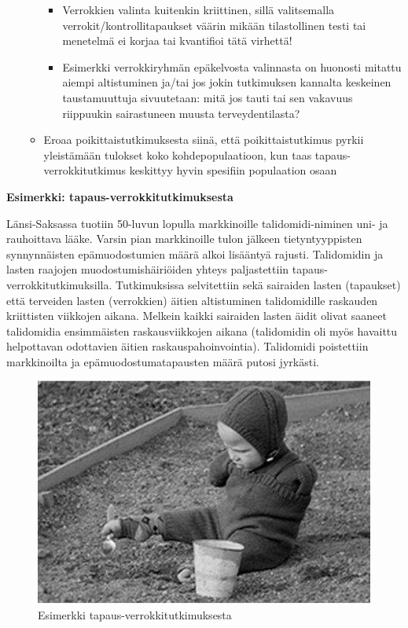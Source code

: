 \documentclass[
]{book}
\providecommand{\tightlist}{%
  \setlength{\itemsep}{0pt}\setlength{\parskip}{0pt}}
\begin{document}
\begin{itemize}
\begin{itemize}
    \begin{itemize}
    \tightlist
    \item
      Verrokkien valinta kuitenkin kriittinen, sillä valitsemalla verrokit/kontrollitapaukset väärin mikään tilastollinen testi tai menetelmä ei korjaa tai kvantifioi tätä virhettä!
    \item
      Esimerkki verrokkiryhmän epäkelvosta valinnasta on huonosti mitattu aiempi altistuminen ja/tai jos jokin tutkimuksen kannalta keskeinen taustamuuttuja sivuutetaan: mitä jos tauti tai sen vakavuus riippuukin sairastuneen muusta terveydentilasta?
    \end{itemize}
  \item
    Eroaa poikittaistutkimuksesta siinä, että poikittaistutkimus pyrkii yleistämään tulokset koko kohdepopulaatioon, kun taas tapaus-verrokkitutkimus keskittyy hyvin spesifiin populaation osaan
  \end{itemize}
\end{itemize}

\begin{eblock}{}
\textbf{Esimerkki: tapaus-verrokkitutkimuksesta}

Länsi-Saksassa tuotiin 50-luvun lopulla markkinoille talidomidi-niminen uni- ja rauhoittava lääke. Varsin pian markkinoille tulon jälkeen tietyntyyppisten synnynnäisten epämuodostumien määrä alkoi lisääntyä rajusti. Talidomidin ja lasten raajojen muodostumishäiriöiden yhteys paljastettiin tapaus-verrokkitutkimuksilla. Tutkimuksissa selvitettiin sekä sairaiden lasten (tapaukset) että terveiden lasten (verrokkien) äitien altistuminen talidomidille raskauden kriittisten viikkojen aikana. Melkein kaikki sairaiden lasten äidit olivat saaneet talidomidia ensimmäisten raskausviikkojen aikana (talidomidin oli myös havaittu helpottavan odottavien äitien raskauspahoinvointia). Talidomidi poistettiin markkinoilta ja epämuodostumatapausten määrä putosi jyrkästi.

\end{eblock}

\begin{figure}

{\centering \includegraphics[width=1\linewidth]{images/tali} 

}

\caption{Esimerkki tapaus-verrokkitutkimuksesta}\label{fig:tali}
\end{figure}
\end{document}
